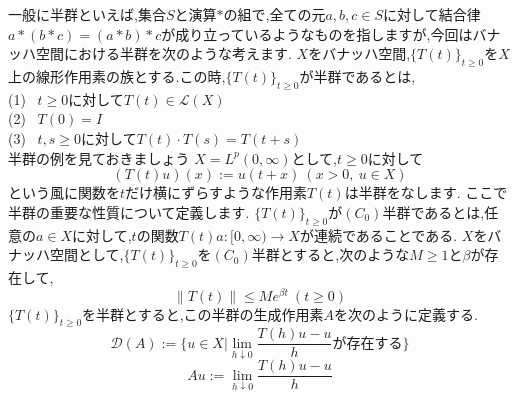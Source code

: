 一般に半群といえば,集合$S$と演算$*$の組で,全ての元$a,b,c\in S$に対して結合律$a*(b*c)=(a*b)*c$が成り立っているようなものを指しますが,今回はバナッハ空間における半群を次のような考えます.
$X$をバナッハ空間,$\{ T(t) \}_{t\ge 0}$を$X$上の線形作用素の族とする.この時,$\{ T(t) \}_{t\ge 0}$が半群であるとは,\\
(1) \ $t\ge 0$に対して$T(t) \in \mathcal{L}(X) $\\
(2) \ $T(0) = I$\\
(3) \ $t,s\ge 0$に対して$T(t) \cdot T(s) = T(t+s)$\\
半群の例を見ておきましょう
\ex
$X=L^p(0,\infty )$として,$t\ge 0$に対して
\[ (T(t)u)(x) := u(t+x) \ (x>0 ,\ u\in X) \]
という風に関数を$t$だけ横にずらすような作用素$T(t)$は半群をなします.
\exx
ここで半群の重要な性質について定義します.
$\{T(t)\}_{t\ge 0}$が$(C_0)$半群であるとは,任意の$a\in X$に対して,$t$の関数$T(t)a:[0,\infty) \to X$が連続であることである.
\thm $X$をバナッハ空間として,$\{T(t)\}_{t\ge 0}$を$(C_0)$半群とすると,次のような$M \ge 1$と$\beta$が存在して,
\[ \| T(t) \| \le M e^{\beta t} \ (t\ge 0) \]
\thmx
{}
$\{T(t)\}_{t\ge 0}$を半群とすると,この半群の生成作用素$A$を次のように定義する.
\[
\mathcal {D}(A) := \{ u \in X | \lim_{h\downarrow 0} \frac{T(h)u-u}{h}が存在する \}
\]
\[
Au :=  \lim_{h\downarrow 0} \frac{T(h)u-u}{h}
\]

